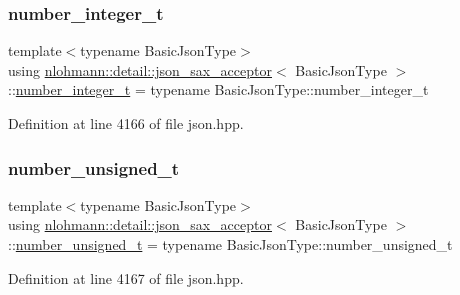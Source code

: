 \subsubsection{\texorpdfstring{number\+\_\+integer\+\_\+t}{number\_integer\_t}}
{\footnotesize\ttfamily template$<$typename Basic\+Json\+Type$>$ \\
using \hyperlink{classnlohmann_1_1detail_1_1json__sax__acceptor}{nlohmann\+::detail\+::json\+\_\+sax\+\_\+acceptor}$<$ Basic\+Json\+Type $>$\+::\hyperlink{structnlohmann_1_1json__sax_a0cef30121f02b7fee85e9708148ea0aa}{number\+\_\+integer\+\_\+t} =  typename Basic\+Json\+Type\+::number\+\_\+integer\+\_\+t}



Definition at line 4166 of file json.\+hpp.

\mbox{\label{classnlohmann_1_1detail_1_1json__sax__acceptor_ae07454608ea6f3cfb765f95e3c850043}} 
\subsubsection{\texorpdfstring{number\+\_\+unsigned\+\_\+t}{number\_unsigned\_t}}
{\footnotesize\ttfamily template$<$typename Basic\+Json\+Type$>$ \\
using \hyperlink{classnlohmann_1_1detail_1_1json__sax__acceptor}{nlohmann\+::detail\+::json\+\_\+sax\+\_\+acceptor}$<$ Basic\+Json\+Type $>$\+::\hyperlink{structnlohmann_1_1json__sax_a32028cc056ae0f43aaae331cdbbbf856}{number\+\_\+unsigned\+\_\+t} =  typename Basic\+Json\+Type\+::number\+\_\+unsigned\+\_\+t}



Definition at line 4167 of file json.\+hpp.

\mbox{\label{classnlohmann_1_1detail_1_1json__sax__acceptor_a3a8078bbf865ec355106f6048241609a}} 
